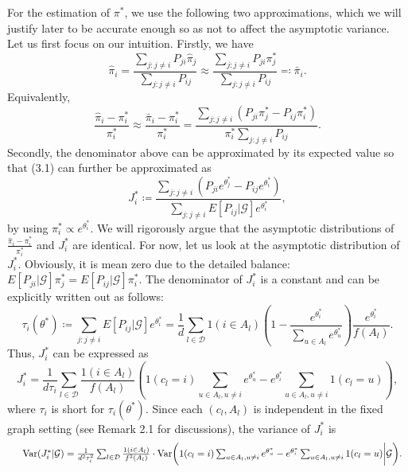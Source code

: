 For the estimation of \(\pi^{*}\), we use the following two approximations, which we will justify later to be accurate enough so as not to affect the asymptotic variance. Let us first focus on our intuition. Firstly, we have
\[
\widehat{\pi}_{i} = \frac{\sum_{j:j\neq i}P_{ji}\widehat{\pi}_{j}}{\sum_{j:j\neq i}P_{ij}}\approx \frac{\sum_{j:j\neq i}P_{ji}\pi_{j}^{*}}{\sum_{j:j\neq i}P_{ij}} \eqqcolon \bar{\pi}_{i}.
\]
Equivalently,
\[
\frac{\widehat{\pi}_{i} - \pi_{i}^{*}}{\pi_{i}^{*}}\approx \frac{\bar{\pi}_{i} - \pi_{i}^{*}}{\pi_{i}^{*}} = \frac{\sum_{j:j\neq i}(P_{ji}\pi_{j}^{*} - P_{ij}\pi_{i}^{*})}{\pi_{i}^{*}\sum_{j:j\neq i}P_{ij}}.
\]
Secondly, the denominator above can be approximated by its expected value so that (3.1) can further be approximated as
\[
J_{i}^{*}\coloneqq \frac{\sum_{j:j\neq i}(P_{ji}e^{\theta_{j}^{*}} - P_{ij}e^{\theta_{i}^{*}})}{\sum_{j:j\neq i}E[P_{ij}|\mathcal{G}]e^{\theta_{i}^{*}}}, \tag{3.2}
\]
by using \(\pi_{i}^{*}\propto e^{\theta_{i}^{*}}\). We will rigorously argue that the asymptotic distributions of \(\frac{\widehat{\pi}_{i} - \pi_{i}^{*}}{\pi_{i}^{*}}\) and \(J_{i}^{*}\) are identical. For now, let us look at the asymptotic distribution of \(J_{i}^{*}\). Obviously, it is mean zero due to the detailed balance: \(E[P_{ji}|\mathcal{G}]\pi_{j}^{*} = E[P_{ij}|\mathcal{G}]\pi_{i}^{*}\). The denominator of \(J_{i}^{*}\) is a constant and can be explicitly written out as follows:
\[
\tau_{i}(\theta^{*})\coloneqq \sum_{j:j\neq i}E[P_{ij}|\mathcal{G}]e^{\theta_{i}^{*}} = \frac{1}{d}\sum_{l\in \mathcal{D}}1(i\in A_{l})\left(1 - \frac{e^{\theta_{i}^{*}}}{\sum_{u\in A_{l}}e^{\theta_{u}^{*}}}\right)\frac{e^{\theta_{i}^{*}}}{f(A_{l})}.
\]
Thus, \(J_{i}^{*}\) can be expressed as
\[
J_{i}^{*} = \frac{1}{d\tau_{i}}\sum_{l\in \mathcal{D}}\frac{1(i\in A_{l})}{f(A_{l})}\left(1(c_{l} = i)\sum_{u\in A_{l},u\neq i}e^{\theta_{u}^{*}} - e^{\theta_{i}^{*}}\sum_{u\in A_{l},u\neq i}1(c_{l} = u)\right),
\]
where \(\tau_{i}\) is short for \(\tau_{i}(\theta^{*})\). Since each \((c_{l},A_{l})\) is independent in the fixed graph setting (see Remark 2.1 for discussions), the variance of \(J_{i}^{*}\) is
\[
\begin{array}{r l} & {\mathrm{Var}(J_{i}^{*}|\mathcal{G}) = \frac{1}{d^{2}\tau_{i}^{2}}\sum_{l\in \mathcal{D}}\frac{1(i\in A_{l})}{f^{2}(A_{l})}\cdot \mathrm{Var}\bigg(1(c_{l} = i)\sum_{u\in A_{l},u\neq i}e^{\theta_{u}^{*}} - e^{\theta_{i}^{*}}\sum_{u\in A_{l},u\neq i}1(c_{l} = u)\bigg|\mathcal{G}\bigg).}
\end{array}
\]
